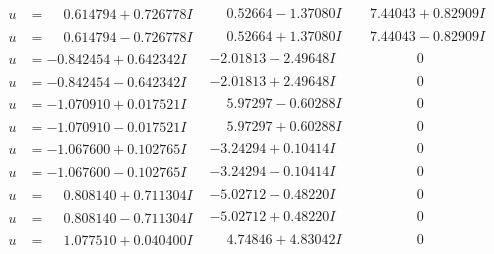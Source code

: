 \documentclass[1p]{elsarticle_modified}
\theoremstyle{definition}
\begin{document}
$$\begin{array}{c|c|c}
\begin{aligned}
u &= \phantom{-}0.614794 + 0.726778 I\end{aligned}
 & \phantom{-}0.52664 - 1.37080 I & \phantom{-}7.44043 + 0.82909 I \\ \hline\begin{aligned}
u &= \phantom{-}0.614794 - 0.726778 I\end{aligned}
 & \phantom{-}0.52664 + 1.37080 I & \phantom{-}7.44043 - 0.82909 I \\ \hline\begin{aligned}
u &= -0.842454 + 0.642342 I\end{aligned}
 & -2.01813 - 2.49648 I & \phantom{-0.000000 } 0 \\ \hline\begin{aligned}
u &= -0.842454 - 0.642342 I\end{aligned}
 & -2.01813 + 2.49648 I & \phantom{-0.000000 } 0 \\ \hline\begin{aligned}
u &= -1.070910 + 0.017521 I\end{aligned}
 & \phantom{-}5.97297 - 0.60288 I & \phantom{-0.000000 } 0 \\ \hline\begin{aligned}
u &= -1.070910 - 0.017521 I\end{aligned}
 & \phantom{-}5.97297 + 0.60288 I & \phantom{-0.000000 } 0 \\ \hline\begin{aligned}
u &= -1.067600 + 0.102765 I\end{aligned}
 & -3.24294 + 0.10414 I & \phantom{-0.000000 } 0 \\ \hline\begin{aligned}
u &= -1.067600 - 0.102765 I\end{aligned}
 & -3.24294 - 0.10414 I & \phantom{-0.000000 } 0 \\ \hline\begin{aligned}
u &= \phantom{-}0.808140 + 0.711304 I\end{aligned}
 & -5.02712 - 0.48220 I & \phantom{-0.000000 } 0 \\ \hline\begin{aligned}
u &= \phantom{-}0.808140 - 0.711304 I\end{aligned}
 & -5.02712 + 0.48220 I & \phantom{-0.000000 } 0 \\ \hline\begin{aligned}
u &= \phantom{-}1.077510 + 0.040400 I\end{aligned}
 & \phantom{-}4.74846 + 4.83042 I & \phantom{-0.000000 } 0 \\ \hline\begin{aligned}

\end{aligned}
\end{array}$$
\end{document}
